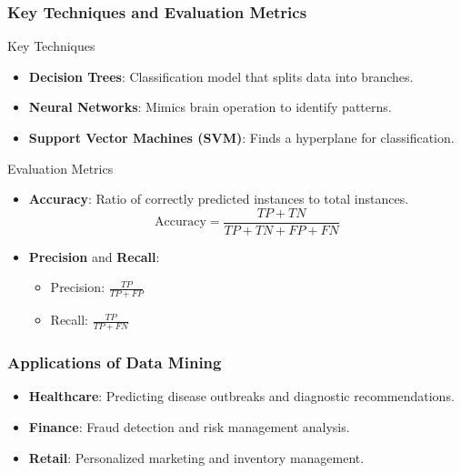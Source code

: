 \documentclass{beamer}
\begin{document}
\begin{frame}[fragile]
    \frametitle{Key Techniques and Evaluation Metrics}
    \begin{block}{Key Techniques}
        \begin{itemize}
            \item \textbf{Decision Trees}: Classification model that splits data into branches.
            \item \textbf{Neural Networks}: Mimics brain operation to identify patterns.
            \item \textbf{Support Vector Machines (SVM)}: Finds a hyperplane for classification.
        \end{itemize}
    \end{block}

    \begin{block}{Evaluation Metrics}
        \begin{itemize}
            \item \textbf{Accuracy}: Ratio of correctly predicted instances to total instances.
            \begin{equation}
                \text{Accuracy} = \frac{TP + TN}{TP + TN + FP + FN}
            \end{equation}
            \item \textbf{Precision} and \textbf{Recall}:
            \begin{itemize}
                \item Precision: \( \frac{TP}{TP + FP} \)
                \item Recall: \( \frac{TP}{TP + FN} \)
            \end{itemize}
        \end{itemize}
    \end{block}
\end{frame}

\begin{frame}[fragile]
    \frametitle{Applications of Data Mining}
    \begin{itemize}
        \item \textbf{Healthcare}: Predicting disease outbreaks and diagnostic recommendations.
        \item \textbf{Finance}: Fraud detection and risk management analysis.
        \item \textbf{Retail}: Personalized marketing and inventory management.
    \end{itemize}
\end{frame}
\end{document}
